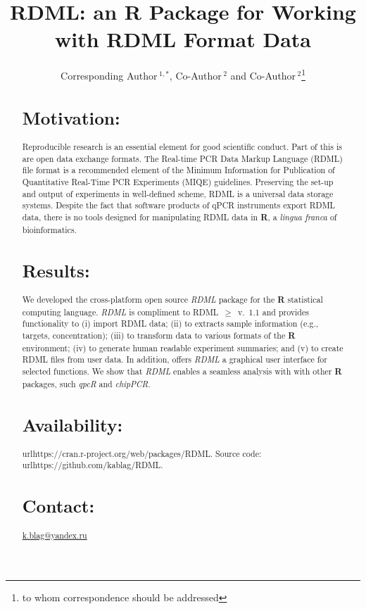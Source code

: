 \documentclass{bioinfo}
\begin{document}
	
	\title[RDML]{RDML: an \textbf{R} Package for Working with RDML Format Data}
	\author[Sample \textit{et~al}]{Corresponding Author\,$^{1,*}$, Co-Author\,$^{2}$
		and Co-Author\,$^2$\footnote{to whom correspondence should be addressed}}
	\address{$^{1}$Department of XXXXXXX, Address XXXX etc.\\ $^{2}$Department of
		XXXXXXXX, Address XXXX etc.}
	
	
	
	\maketitle
	
	\begin{abstract}
		
		\section{Motivation:} Reproducible research is an essential 
		element for good scientific conduct. Part of this is are open data exchange 
		formats. The  Real-time PCR Data Markup Language
		(RDML) file format is a recommended element of the Minimum 
		Information for Publication of Quantitative Real-Time PCR Experiments (MIQE) 
		guidelines. Preserving the set-up and output of experiments in well-defined 
		scheme, RDML is a universal data storage systems. Despite the fact 
		that software products of qPCR instruments export RDML data, 
		there is no tools designed for manipulating RDML data in \textbf{R}, a 
		\textit{lingua franca} of bioinformatics.
		
		\section{Results:} We developed the cross-platform open source 
		\textit{RDML} package for the  \textbf{R} statistical computing language. 
		\textit{RDML} is compliment to RDML~$\geq$~v.~1.1 and provides functionality to 
		(i) import RDML data; (ii) to extracts sample information (e.g., targets, 
		concentration); (iii) to transform data to various formats of the \textbf{R} 
		environment; (iv) to generate human readable experiment summaries; and (v) to 
		create RDML files from user data. In addition, offers \textit{RDML} a graphical 
		user interface for selected functions. We show that \textit{RDML} enables a 
		seamless analysis with with other \textbf{R} packages, such \textit{qpcR} and 
		\textit{chipPCR}.

		\section{Availability:}
		url{https://cran.r-project.org/web/packages/RDML}. Source code:
		url{https://github.com/kablag/RDML}. \section{Contact:}
		\href{k.blag@yandex.ru}{k.blag@yandex.ru} \end{abstract}
	
\end{document}
